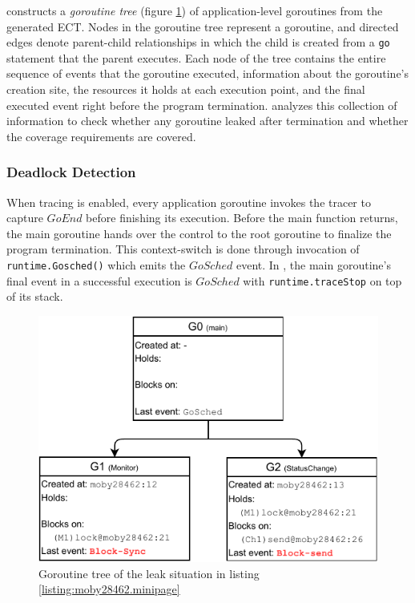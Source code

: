 \goat constructs a \textit{goroutine tree} (figure \ref{fig:gtree}) of application-level goroutines from the generated ECT.
%
Nodes in the goroutine tree represent a goroutine, and directed edges denote parent-child relationships in which the child is created from a \texttt{go} statement that the parent executes.
%
Each node of the tree contains the entire sequence of events that the goroutine executed, information about the goroutine's creation site, the resources it holds at each execution point, and the final executed event right before the program termination.
%
\goat analyzes this collection of information to check whether any goroutine leaked after termination and whether the coverage requirements are covered.

\subsubsection{Deadlock Detection}
When tracing is enabled, every application goroutine invokes the tracer to capture $GoEnd$ before finishing its execution.
%
Before the main function returns, the main goroutine hands over the control to the root goroutine to finalize the program termination.
%
This context-switch is done through invocation of \texttt{runtime.Gosched()} which emits the $GoSched$ event.
%
In \goat, the main goroutine's final event in a successful execution is $GoSched$ with \texttt{runtime.traceStop} on top of its stack.

\begin{figure}[]
\centering
\includegraphics[width=0.75\linewidth]{goat/figs/gtree.pdf}
\caption{Goroutine tree of the leak situation in listing \ref{listing:moby28462.minipage}}
\label{fig:gtree}
\end{figure}

